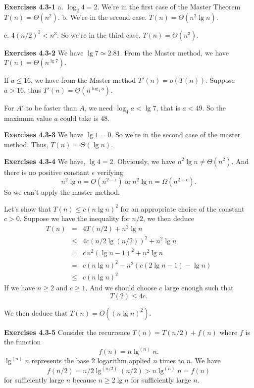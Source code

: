 \documentclass[a4paper,12pt]{article}
\newcommand{\newpar}[1]
{\bigskip \noindent \textbf{Exercises #1} \newline}
\newcommand{\subpar}[1]
{\medskip \noindent #1.}
\begin{document}
\newpar{4.3-1}
\subpar{a} $\log_2 4 = 2$.  We're in the first case of the Master
Theorem $T(n) = \Theta(n^2)$.
\subpar{b} We're in the second case. $T(n) = \Theta(n^2\lg n)$.

\subpar{c} $4 (n/2)^3 < n^3$.  So we're in the third case.  $T(n) =
\Theta(n^3)$.

\newpar{4.3-2}
We have $\lg 7 \simeq 2.81$.  From the Master method, we have $T(n) =
\Theta(n^{\lg 7})$.

If $a \le 16$,  we have from the Master method $T'(n) = o(T(n))$.
Suppose $a > 16$, thus $T'(n) = \Theta(n^{\log_4a})$.

For $A'$ to be faster than $A$, we need $\log_4a < \lg 7$,
that is $ a < 49$. So the maximum value $a$ could take is $48$.

\newpar{4.3-3}
We have $\lg 1 = 0$.  So we're in the second case of the master
method.  Thus, $T(n) = \Theta(\lg n)$.

\newpar{4.3-4}
We have, $\lg 4 = 2$.  Obviously, we have $ n^2 \lg n \not=
\Theta(n^2)$.  And there is no positive constant $\epsilon$
verifying
\[ n^2\lg n = O(n^{2-\epsilon})\ \mbox{or}\ n^2\lg n =
\Omega(n^{2+\epsilon}).\]
So we can't apply the master method.

Let's show that $T(n) \le c(n\lg n)^2$ for an appropriate choice of
the constant $c > 0$.  Suppose we have the inequality for $n/2$, we
then deduce
\begin{eqnarray*}
  T(n) &=& 4T(n/2) + n^2\lg n \\
  &\le& 4c(n/2\lg(n/2))^2 + n^2\lg n \\
  &=& c\,n^2(\lg n - 1)^2 + n^2\lg n \\
  &=& c(n\lg n)^2 - n^2(c(2\lg n - 1) - \lg n) \\
  &\le& c(n\lg n)^2
\end{eqnarray*}
If we have $n \ge 2$ and $c \ge 1$.  And we should choose $c$ large
enough such that
\[ T(2) \le 4c.\]

We then deduce that $T(n) = O((n\lg n)^2)$.

\newpar{4.3-5}
Consider the recurrence $T(n) = T(n/2) + f(n)$ where $f$ is
the function
\[ f(n) = n\lg^{(n)}n.\]
$\lg^{(n)}n$ represents the base 2 logarithm applied $n$ times to $n$.
We have
\[ f(n/2) = n/2 \lg^{(n/2)}(n/2) > n\lg^{(n)}n = f(n)\]
for sufficiently large $n$ because $n \ge 2\lg n$ for sufficiently
large $n$.
\end{document}
